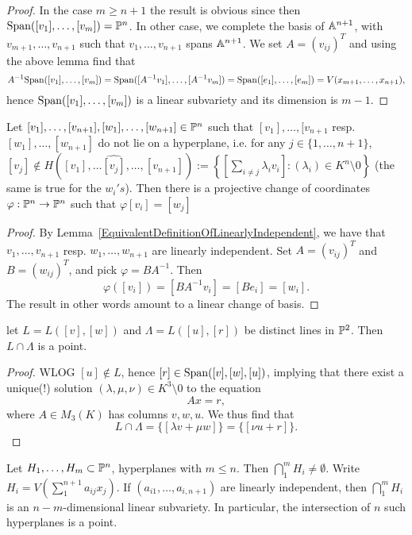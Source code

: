     \begin{proof}
        In the case $m\geq n+1$ the result is obvious since then $\mathrm{Span}([v_1],\dots,[v_m])=\mathbb{P}^n$. In other case, we complete the basis of $\mathbb{A}^{n+1}$, with $v_{m+1},\dots,v_{n+1}$ such that $v_1,\dots, v_{n+1}$ spans $\mathbb{A}^{n+1}$. We set $A = (v_{ij})^T$ and using the above lemma find that 
        $$A^{-1}\mathrm{Span}([v_1],\dots,[v_m])=\mathrm{Span}([A^{-1}v_1],\dots,[A^{-1}v_m])=\mathrm{Span}([e_1],\dots,[e_m])=V(x_{m+1},\dots,x_{n+1}),$$
        hence $\mathrm{Span}([v_1],\dots,[v_m])$ is a linear subvariety and its dimension is $m-1$.
    \end{proof}
    \begin{lemma}\label{ChangeOfProjectiveBasis}
        Let $[v_1],\dots,[v_{n+1}],[w_1],\dots,[w_{n+1}]\in \mathbb{P}^n$ such that $[v_1],\dots,[v_{n+1}$ resp. $[w_1],\dots,[w_{n+1}]$ do not lie on a hyperplane, i.e. for any $j\in\{1,\dots,n+1\}$, $[v_j]\notin H([v_1],\dots \widehat{[v_{j}]},\dots,[v_{n+1}]):= \left\{ \left[\sum_{i\neq j} \lambda_i v_i\right] : (\lambda_i)\in K^{n}\setminus 0\right\}$
        (the same is true for the $w_i's$). Then there is a projective change of coordinates $\varphi : \mathbb{P}^n \rightarrow \mathbb{P}^n$ such that $\varphi [v_i]=[w_j]$ 
    \end{lemma}
    \begin{proof}
        By Lemma~\ref{EquivalentDefinitionOfLinearlyIndependent}, we have that $v_1,\dots,v_{n+1}$ resp. $w_1,\dots,w_{n+1}$ are linearly independent. Set $A = (v_{ij})^T$ and $B= (w_{ij})^T$, and pick $\varphi = BA^{-1}$.
        Then 
        $$\varphi([v_i])=[BA^{-1}v_i]=[Be_i]= [w_i].$$
        The result in other words amount to a linear change of basis.
    \end{proof}
    \begin{lemma}
        let $L=L([v],[w])$ and $\Lambda = L([u],[r])$ be distinct lines in $\mathbb{P}^2$. Then $L\cap \Lambda$ is a point. 
    \end{lemma}
    \begin{proof}
        WLOG $[u]\notin L$, hence $[r]\in \mathrm{Span}([v],[w],[u])$, implying that there exist a unique(!) solution $(\lambda,\mu,\nu)\in K^3\setminus 0$ to the equation 
        $$Ax = r,$$
        where $A\in M_3(K)$ has columns $v,w,u$. We thus find that 
        $$L\cap \Lambda = \{[\lambda v+\mu w]\} = \{ [\nu u+r]\}.$$
    \end{proof}
    \begin{lemma}\label{IntersectionOfSuffManyHyperplanesIsAPoint}
        Let $H_1,\dots,H_m\subset \mathbb{P}^n$, hyperplanes with $m\leq n$. Then $\bigcap_1^m H_i\neq \emptyset$. Write $H_i = V(\sum_1^{n+1} a_{ij}x_j)$. If ${(a_{i1},\dots,a_{i,n+1})}$ are linearly independent, then $\bigcap_1^m H_i$ is an $n-m$-dimensional linear subvariety. In particular, the intersection of $n$ such hyperplanes is a point. 
    \end{lemma}
